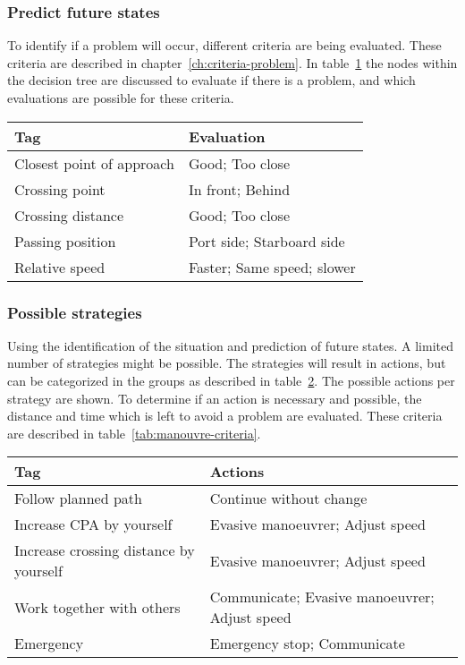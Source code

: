 \subsubsection{Predict future states}
To identify if a problem will occur, different criteria are being evaluated. These criteria are described in chapter~\ref{ch:criteria-problem}. In table~\ref{tab:identification-criteria} the nodes within the decision tree are discussed to evaluate if there is a problem, and which evaluations are possible for these criteria. 
\begin{table}[H]
	\begin{tabular}{p{}|p{}}
		\toprule
		Tag & Evaluation \\
		\midrule
		Closest point of approach & Good; Too close \\
		Crossing point & In front; Behind \\
		Crossing distance & Good; Too close \\
		Passing position & Port side; Starboard side \\
		Relative speed & Faster; Same speed; slower \\
		\bottomrule
	\end{tabular}
	
	\label{tab:identification-criteria}
\end{table}

\subsubsection{Possible strategies}
Using the identification of the situation and prediction of future states. A limited number of strategies might be possible. The strategies will result in actions, but can be categorized in the groups as described in table~\ref{tab:strategies}. The possible actions per strategy are shown. To determine if an action is necessary and possible, the distance and time which is left to avoid a problem are evaluated. These criteria are described in table~\ref{tab:manouvre-criteria}.
\begin{table}[H]
	\begin{tabular}{p{}|p{}}
		\toprule
		Tag & Actions \\
		\midrule
		Follow planned path & Continue without change\\
		Increase CPA by yourself & Evasive manoeuvrer; Adjust speed \\
		Increase crossing distance by yourself & Evasive manoeuvrer; Adjust speed \\
		Work together with others & Communicate; Evasive manoeuvrer; Adjust speed \\
		Emergency & Emergency stop; Communicate \\
		\bottomrule
	\end{tabular}
	
	\label{tab:strategies}
\end{table}


